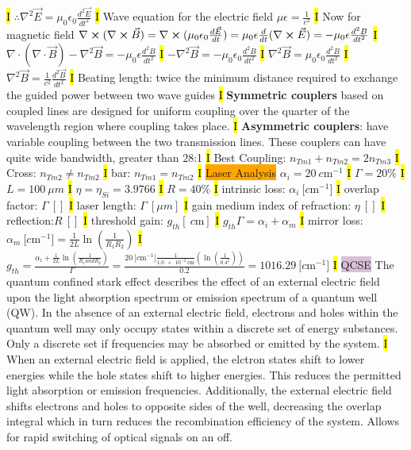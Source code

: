 \documentclass[fontsize=3]{scrartcl}
\begin{document}
\hl{I}
$\therefore \nabla^2 \vec{E} = \mu_0 \epsilon_0 \frac{d^2 \vec{E}}{dt^2} $
\hl{I}
Wave equation for the electric field $\mu \epsilon = \frac{1}{c^2}$
\hl{I}
Now for magnetic field $\nabla \cross (\nabla \cross \vec{B}) = \nabla \cross (\mu_0 \epsilon_0 \frac{d\vec{E}}{dt}) = \mu_0 \epsilon \frac{d}{dt}(\nabla \cross \vec{E}) = -\mu_0 \epsilon \frac{d^2 B}{dt^2}$
\hl{I}
$\nabla \cdot (\nabla \cdot \vec{B}) - \nabla^2 \vec{B} = -\mu_0 \epsilon \frac{d^2 B}{dt^2}$
\hl{I}
$-\nabla^2 \vec{B} = -\mu_0 \epsilon_0 \frac{d^2 B}{dt^2}$
\hl{I}
$\nabla^2 \vec{B} = \mu_0 \epsilon_0 \frac{d^2 B}{dt^2}$
\hl{I}
$\nabla^2 \vec{B} = \frac{1}{c^2} \frac{d^2 \vec{B}}{dt^2}$
\hl{I}
Beating length: twice the minimum distance required to exchange the guided power between two wave guides
\hl{I}
\textbf{Symmetric couplers} based on coupled lines are designed for uniform coupling over the quarter of the wavelength region where coupling takes place.
\hl{I}
\textbf{Asymmetric couplers}: have variable coupling between the two transmission lines. These couplers can have quite wide bandwidth, greater than 28:1
\hl{I}
Best Coupling: $n_{Tm1} + n_{Tm2} = 2n_{Tm3}$
\hl{I}
Cross: $n_{Tm2} \neq n_{Tm2}$
\hl{I}
bar: $n_{Tm1} = n_{Tm2}$
\hl{I}
\colorbox{Orange}{Laser Analysis}
$\alpha_i = 20 \SI{}{c \meter^{-1}}$
\hl{I}
$\Gamma = 20 \% $
\hl{I}
$L = \SI{100}{\mu m}$
\hl{I}
$\eta = \eta_{Si} = 3.9766$
\hl{I}
$R = 40\%$
\hl{I}
intrinsic loss: $\alpha_i \SI{}{[c\meter^{-1}]}$
\hl{I}
overlap factor: $\Gamma \SI{}{[]}$
\hl{I}
laser length: $\Gamma \SI{}{[\mu m]}$
\hl{I}
gain medium index of refraction: $\eta \SI{}{[ ]}$
\hl{I}
reflection:$R \SI{}{[ ]}$
\hl{I}
threshold gain: $g_{th} [\SI{}{c \meter}]$
\hl{I}
$g_{th}\Gamma = \alpha_i + \alpha_m $
\hl{I}
mirror loss: $\alpha_m \SI{}{[c\meter^{-1}]} = \frac{1}{2L} \ln(\frac{1}{R_1 R_2})$
\hl{I}
$g_{th} = \frac{\alpha_{i} + \frac{1}{2L} \ln(\frac{1}{R_1 and R_2})}{\Gamma} = \frac{\SI{20}{[c\meter^{-1}] }  \frac{1}{\SI{1.0e-2}{c\meter}} (\ln(\frac{1}{0.4^2})) } {0.2} = \SI{1016.29}{[ c\meter^{-1} ]}$
\hl{I}
\colorbox{Thistle}{QCSE}
The quantum confined stark effect describes the effect of an external electric field upon the light absorption spectrum or emission spectrum of a quantum well (QW). In the absence of an external electric field, electrons and holes within the quantum well may only occupy states within a discrete set of energy substances. Only a discrete set if frequencies may be absorbed or emitted by the system.
\hl{I}
When an external electric field is applied, the elctron states shift to lower energies while the hole states shift to higher energies. This reduces the permitted light absorption or emission frequencies. Additionally, the external electric field shifts electrons and holes to opposite sides of the well, decreasing the overlap integral which in turn reduces the recombination efficiency of the system. Allows for rapid switching of optical signals on an off. 
\end{document}
